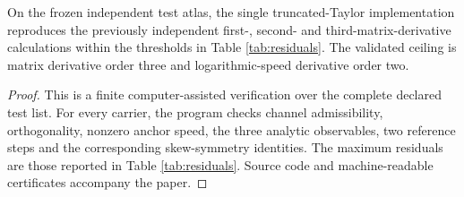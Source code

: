 \begin{proposition}
\label{prop:validationceiling}
On the frozen independent test atlas, the single truncated-Taylor implementation reproduces the previously independent first-, second- and third-matrix-derivative calculations within the thresholds in Table \ref{tab:residuals}.  The validated ceiling is matrix derivative order three and logarithmic-speed derivative order two.
\end{proposition}

\begin{proof}
This is a finite computer-assisted verification over the complete declared test list.  For every carrier, the program checks channel admissibility, orthogonality, nonzero anchor speed, the three analytic observables, two reference steps and the corresponding skew-symmetry identities.  The maximum residuals are those reported in Table \ref{tab:residuals}.  Source code and machine-readable certificates accompany the paper.
\end{proof}
